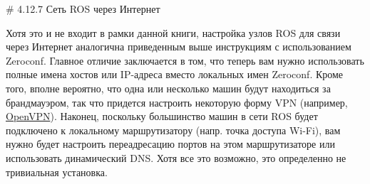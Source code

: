 # 4.12.7 Сеть ROS через Интернет


Хотя это и не входит в рамки данной книги, настройка узлов ROS для связи через Интернет аналогична приведенным выше инструкциям с использованием Zeroconf. Главное отличие заключается в том, что теперь вам нужно использовать полные имена хостов или IP-адреса вместо локальных имен Zeroconf. Кроме того, вполне вероятно, что одна или несколько машин будут находиться за брандмауэром, так что придется настроить некоторую форму VPN (например, \href{https://help.ubuntu.com/14.04/serverguide/openvpn.html}{OpenVPN}). Наконец, поскольку большинство машин в сети ROS будет подключено к локальному маршрутизатору (напр. точка доступа Wi-Fi), вам нужно будет настроить переадресацию портов на этом маршрутизаторе или использовать динамический DNS. Хотя все это возможно, это определенно не тривиальная установка.

